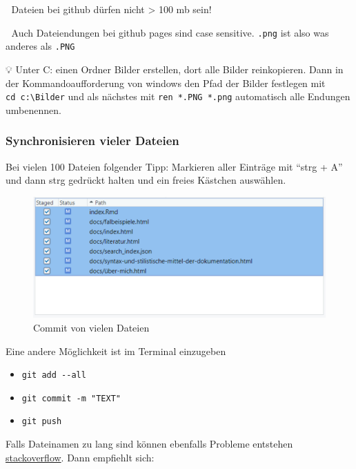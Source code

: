 \documentclass[
]{article}
\providecommand{\tightlist}{%
  \setlength{\itemsep}{0pt}\setlength{\parskip}{0pt}}
\begin{document}
🚨 Dateien bei github dürfen nicht \textgreater{} 100 mb sein!

🚨 Auch Dateiendungen bei github pages sind case sensitive. \texttt{.png} ist also was anderes als \texttt{.PNG}

💡 Unter C: einen Ordner Bilder erstellen, dort alle Bilder reinkopieren. Dann in der Kommandoaufforderung von windows den Pfad der Bilder festlegen mit \texttt{cd\ c:\textbackslash{}Bilder} und als nächstes mit \texttt{ren\ *.PNG\ *.png} automatisch alle Endungen umbenennen.

\hypertarget{synchronisieren-vieler-dateien}{%
\subsubsection{Synchronisieren vieler Dateien}\label{synchronisieren-vieler-dateien}}

Bei vielen 100 Dateien folgender Tipp: Markieren aller Einträge mit ``strg + A'' und dann strg gedrückt halten und ein freies Kästchen auswählen. 🎉

\begin{figure}

{\centering \includegraphics[width=1\linewidth]{images/074} 

}

\caption{Commit von vielen Dateien}\label{fig:unnamed-chunk-303}
\end{figure}

Eine andere Möglichkeit ist im Terminal einzugeben

\begin{itemize}
\tightlist
\item
  \texttt{git\ add\ -\/-all}
\item
  \texttt{git\ commit\ -m\ "TEXT"}
\item
  \texttt{git\ push}
\end{itemize}

Falls Dateinamen zu lang sind können ebenfalls Probleme entstehen \href{https://stackoverflow.com/questions/52699177/how-to-fix-filename-too-long-error-during-git-clone/52699496}{stackoverflow}. Dann empfiehlt sich:
\end{document}
